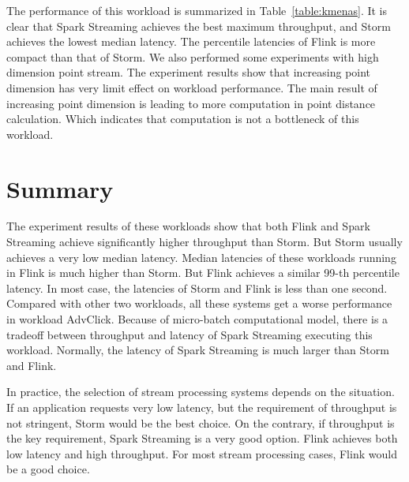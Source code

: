 The performance of this workload is summarized in Table~\ref{table:kmenas}. It is clear that Spark Streaming achieves the best maximum throughput, and Storm achieves the lowest median latency. The percentile latencies of Flink is more compact than that of Storm. We also performed some experiments with high dimension point stream. The experiment results show that increasing point dimension has very limit effect on workload performance. The main result of increasing point dimension is leading to more computation in point distance calculation. Which indicates that computation is not a bottleneck of this workload. 

\section{Summary}

The experiment results of these workloads show that both Flink and Spark Streaming achieve significantly higher throughput than Storm. But Storm usually achieves a very low median latency. Median latencies of these workloads running in Flink is much higher than Storm. But Flink achieves a similar 99-th percentile latency. In most case, the latencies of Storm and Flink is less than one second. Compared with other two workloads, all these systems get a worse performance in workload AdvClick. Because of micro-batch computational model, there is a tradeoff between throughput and latency of Spark Streaming executing this workload. Normally, the latency of Spark Streaming is much larger than Storm and Flink. 

In practice, the selection of stream processing systems depends on the situation. If an application requests very low latency, but the requirement of throughput is not stringent, Storm would be the best choice. On the contrary, if throughput is the key requirement, Spark Streaming is a very good option. Flink achieves both low latency and high throughput. For most stream processing cases, Flink would be a good choice. 

\clearpage



